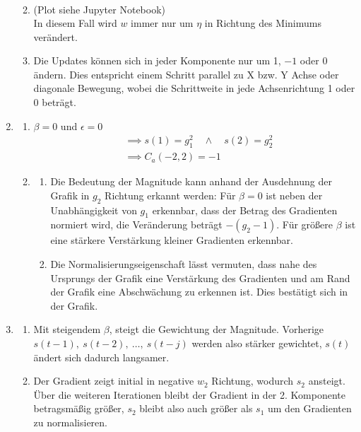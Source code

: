 \documentclass{article}
\begin{document}
\begin{enumerate}
\begin{enumerate}[label=\alph*)]
\begin{align*}
                \end{align*}
          \item (Plot siehe Jupyter Notebook)\\
                In diesem Fall wird $w$ immer nur um $\eta$ in Richtung des Minimums verändert.
          \item Die Updates können sich in jeder Komponente nur um 1, $-1$ oder 0 ändern. Dies entspricht einem Schritt parallel zu X bzw. Y Achse oder diagonale Bewegung, wobei die Schrittweite in jede Achsenrichtung 1 oder 0 beträgt.
        \end{enumerate}
  \item
        \begin{enumerate}[label=\alph*)]
          \item $\beta = 0$ und $\epsilon = 0$
                \begin{align*}
                   & \implies s(1) = g_1^2 \quad \wedge \quad s(2)=g_2^2 \\
                   & \implies C_a(-2,2) = -1
                \end{align*}
          \item
                \begin{enumerate}[label=\roman*)]
                  \item Die Bedeutung der Magnitude kann anhand der Ausdehnung der Grafik in $g_2$ Richtung erkannt werden: Für $\beta = 0$ ist neben der Unabhängigkeit von $g_1$ erkennbar, dass der Betrag des Gradienten normiert wird, die Veränderung beträgt $-(g_2 - 1)$. Für größere $\beta$ ist eine stärkere Verstärkung kleiner Gradienten erkennbar.
                  \item Die Normalisierungseigenschaft lässt vermuten, dass nahe des Ursprungs der Grafik eine Verstärkung des Gradienten und am Rand der Grafik eine Abschwächung zu erkennen ist. Dies bestätigt sich in der Grafik.
                \end{enumerate}
        \end{enumerate}
  \item
        \begin{enumerate}[label=\alph*)]
          \item
                Mit steigendem $\beta$, steigt die Gewichtung der Magnitude. Vorherige $s(t-1),\ s(t-2), \ \dots,\ s(t-j)$ werden also stärker gewichtet, $s(t)$ ändert sich dadurch langsamer.
          \item Der Gradient zeigt initial in negative $w_2$ Richtung, wodurch $s_2$ ansteigt. Über die weiteren Iterationen bleibt der Gradient in der 2. Komponente betragsmäßig größer, $s_2$ bleibt also auch größer als $s_1$ um den Gradienten zu normalisieren.

\end{enumerate}
\end{enumerate}
\end{document}
